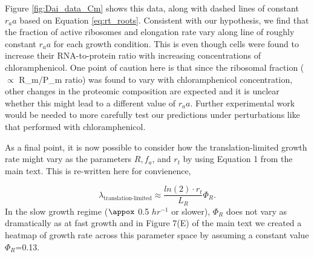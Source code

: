 \begin{figure}
\end{figure}

Figure \ref{fig:Dai_data_Cm} shows this data, along with dashed lines of
constant $r_aa$ based on Equation \ref{eq:rt_roots}. Consistent with our
hypothesis, we find that the fraction of active ribosomes and elongation rate
vary along line of roughly constant $r_aa$ for each growth condition. This is
even though cells were found to increase their RNA-to-protein ratio with
increasing concentrations of chloramphenicol. One point of caution here is that
since the ribosomal fraction ($\propto$ R_m/P_m ratio) was found to vary with
chloramphenicol concentration, other changes in the proteomic composition are
expected and it is unclear whether this might lead to a different value of
$r_aa$. Further experimental work would be needed to more carefully test our
predictions under perturbations like that performed with chloramphenicol.

As a final point, it is now possible to consider how the translation-limited
growth rate  might vary as the parameters $R, f_a$, and $r_t$ by using Equation
1 from the main text. This is re-written here for convienence,

\begin{equation}
\lambda_{\textrm{translation-limited}} \approx \frac{ln(2) \cdot r_t}{L_R}  \Phi_R.
\end{equation}
In the slow growth regime ($\appox$ 0.5 $hr^{-1}$ or slower), $\Phi_R$ does not
vary as dramatically as at fast growth and  in Figure 7(E) of the main text we
created a heatmap of growth rate across this parameter space by assuming a
constant value $\Phi_R$=0.13.
